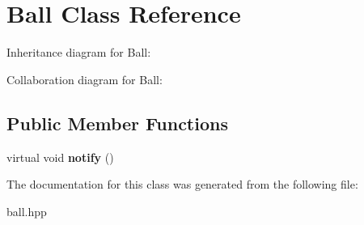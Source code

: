 \hypertarget{classBall}{}\section{Ball Class Reference}
\label{classBall}


Inheritance diagram for Ball\+:


Collaboration diagram for Ball\+:
\subsection*{Public Member Functions}
\begin{DoxyCompactItemize}
\item 
virtual void {\bfseries notify} ()\hypertarget{classBall_aac709d26ebeb71a87af845dc8c2316a2}{}\label{classBall_aac709d26ebeb71a87af845dc8c2316a2}

\end{DoxyCompactItemize}


The documentation for this class was generated from the following file\+:\begin{DoxyCompactItemize}
\item 
ball.\+hpp\end{DoxyCompactItemize}

